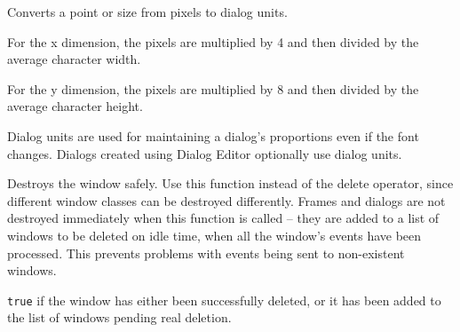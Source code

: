 \label{wxwindowconvertpixelstodialog}



Converts a point or size from pixels to dialog units.

For the x dimension, the pixels are multiplied by 4 and then divided by the average
character width.

For the y dimension, the pixels are multiplied by 8 and then divided by the average
character height.


Dialog units are used for maintaining a dialog's proportions even if the font changes.
Dialogs created using Dialog Editor optionally use dialog units.





\label{wxwindowdestroy}


Destroys the window safely. Use this function instead of the delete operator, since
different window classes can be destroyed differently. Frames and dialogs
are not destroyed immediately when this function is called -- they are added
to a list of windows to be deleted on idle time, when all the window's events
have been processed. This prevents problems with events being sent to non-existent
windows.


{\tt true} if the window has either been successfully deleted, or it has been added
to the list of windows pending real deletion.



